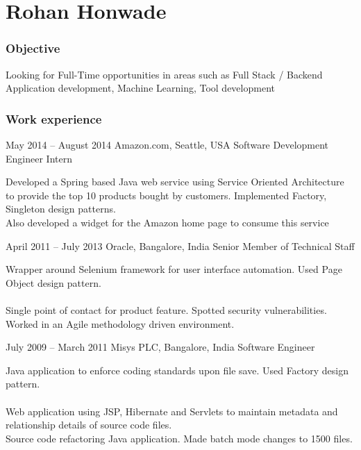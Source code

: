 \documentclass{tccv}
\begin{document}
\part{Rohan Honwade}


\section{Objective}
Looking for Full-Time opportunities in areas such as 
Full Stack / Backend Application development, Machine Learning, Tool development

\section{Work experience}
\begin{eventlist}
\item{May 2014 -- August 2014}
     {Amazon.com, Seattle, USA}
     {Software Development Engineer Intern}

Developed a Spring based Java web service using Service Oriented Architecture to provide the top 10 products bought by customers. Implemented Factory, Singleton design patterns.\\

Also developed a widget for the Amazon home page to consume this service


\item{April 2011 -- July 2013}
     {Oracle, Bangalore, India}
     {Senior Member of Technical Staff}

Wrapper around Selenium framework for user interface automation. Used Page Object design pattern.\\
\\

Single point of contact for product feature. Spotted security vulnerabilities. Worked in an Agile methodology driven environment.

\item{July 2009 -- March 2011}
     {Misys PLC, Bangalore, India}
     {Software Engineer}

Java application to enforce coding standards upon file save. Used Factory design pattern.\\
\\

Web application using JSP, Hibernate and Servlets to maintain metadata and relationship details of source code files.\\

Source code refactoring Java application. Made batch mode changes to 1500 files.\\
\\
\end{eventlist}
\end{document}
